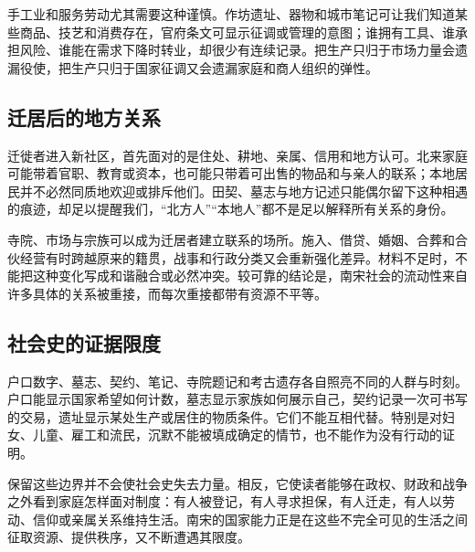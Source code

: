 手工业和服务劳动尤其需要这种谨慎。作坊遗址、器物和城市笔记可让我们知道某些商品、技艺和消费存在，官府条文可显示征调或管理的意图；谁拥有工具、谁承担风险、谁能在需求下降时转业，却很少有连续记录。把生产只归于市场力量会遗漏役使，把生产只归于国家征调又会遗漏家庭和商人组织的弹性。

\subsection{迁居后的地方关系}

迁徙者进入新社区，首先面对的是住处、耕地、亲属、信用和地方认可。北来家庭可能带着官职、教育或资本，也可能只带着可出售的物品和与亲人的联系；本地居民并不必然同质地欢迎或排斥他们。田契、墓志与地方记述只能偶尔留下这种相遇的痕迹，却足以提醒我们，“北方人”“本地人”都不是足以解释所有关系的身份。

寺院、市场与宗族可以成为迁居者建立联系的场所。施入、借贷、婚姻、合葬和合伙经营有时跨越原来的籍贯，战事和行政分类又会重新强化差异。材料不足时，不能把这种变化写成和谐融合或必然冲突。较可靠的结论是，南宋社会的流动性来自许多具体的关系被重接，而每次重接都带有资源不平等。

\subsection{社会史的证据限度}

户口数字、墓志、契约、笔记、寺院题记和考古遗存各自照亮不同的人群与时刻。户口能显示国家希望如何计数，墓志显示家族如何展示自己，契约记录一次可书写的交易，遗址显示某处生产或居住的物质条件。它们不能互相代替。特别是对妇女、儿童、雇工和流民，沉默不能被填成确定的情节，也不能作为没有行动的证明。

保留这些边界并不会使社会史失去力量。相反，它使读者能够在政权、财政和战争之外看到家庭怎样面对制度：有人被登记，有人寻求担保，有人迁走，有人以劳动、信仰或亲属关系维持生活。南宋的国家能力正是在这些不完全可见的生活之间征取资源、提供秩序，又不断遭遇其限度。
